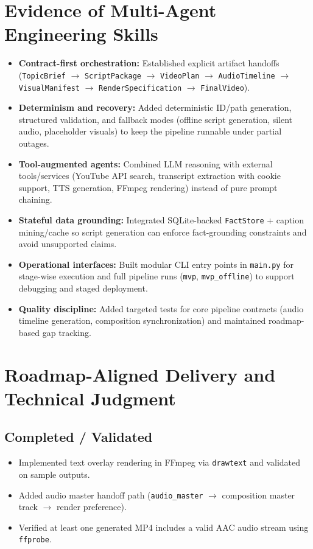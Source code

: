 \documentclass{article}
\begin{document}
\section{Evidence of Multi-Agent Engineering Skills}
\begin{itemize}
    \item \textbf{Contract-first orchestration:} Established explicit artifact handoffs (\texttt{TopicBrief} $\rightarrow$ \texttt{ScriptPackage} $\rightarrow$ \texttt{VideoPlan} $\rightarrow$ \texttt{AudioTimeline} $\rightarrow$ \texttt{VisualManifest} $\rightarrow$ \texttt{RenderSpecification} $\rightarrow$ \texttt{FinalVideo}).
    \item \textbf{Determinism and recovery:} Added deterministic ID/path generation, structured validation, and fallback modes (offline script generation, silent audio, placeholder visuals) to keep the pipeline runnable under partial outages.
    \item \textbf{Tool-augmented agents:} Combined LLM reasoning with external tools/services (YouTube API search, transcript extraction with cookie support, TTS generation, FFmpeg rendering) instead of pure prompt chaining.
    \item \textbf{Stateful data grounding:} Integrated SQLite-backed \texttt{FactStore} + caption mining/cache so script generation can enforce fact-grounding constraints and avoid unsupported claims.
    \item \textbf{Operational interfaces:} Built modular CLI entry points in \texttt{main.py} for stage-wise execution and full pipeline runs (\texttt{mvp}, \texttt{mvp\_offline}) to support debugging and staged deployment.
    \item \textbf{Quality discipline:} Added targeted tests for core pipeline contracts (audio timeline generation, composition synchronization) and maintained roadmap-based gap tracking.
\end{itemize}

\section{Roadmap-Aligned Delivery and Technical Judgment}
\subsection*{Completed / Validated}
\begin{itemize}
    \item Implemented text overlay rendering in FFmpeg via \texttt{drawtext} and validated on sample outputs.
    \item Added audio master handoff path (\texttt{audio\_master} $\rightarrow$ composition master track $\rightarrow$ render preference).
    \item Verified at least one generated MP4 includes a valid AAC audio stream using \texttt{ffprobe}.
\end{itemize}
\end{document}
